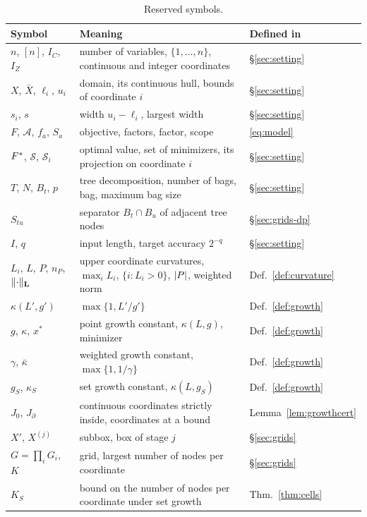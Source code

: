\begin{table}[htbp]
\centering
\small
\caption{Reserved symbols.}\label{tab:notation}
\begin{tabular}{@{}lll@{}}
\toprule
Symbol & Meaning & Defined in\\
\midrule
$n$, $[n]$, $I_C$, $I_Z$ & number of variables, $\{1,\dots,n\}$, continuous and integer coordinates & \S\ref{sec:setting}\\
$X$, $\bar X$, $\ell_i$, $u_i$ & domain, its continuous hull, bounds of coordinate $i$ & \S\ref{sec:setting}\\
$s_i$, $s$ & width $u_i-\ell_i$, largest width & \S\ref{sec:setting}\\
$F$, $\mathcal A$, $f_a$, $S_a$ & objective, factors, factor, scope & \eqref{eq:model}\\
$F^{*}$, $\mathcal S$, $\mathcal S_i$ & optimal value, set of minimizers, its projection on coordinate $i$ & \S\ref{sec:setting}\\
$T$, $N$, $B_t$, $p$ & tree decomposition, number of bags, bag, maximum bag size & \S\ref{sec:setting}\\
$S_{tu}$ & separator $B_t\cap B_u$ of adjacent tree nodes & \S\ref{sec:grids-dp}\\
$I$, $q$ & input length, target accuracy $2^{-q}$ & \S\ref{sec:setting}\\
$L_i$, $L$, $P$, $n_P$, $\lVert \cdot\rVert_{\mathbf L}$ & upper coordinate curvatures, $\max_iL_i$, $\{i:L_i>0\}$, $\lvert P\rvert$, weighted norm & Def.~\ref{def:curvature}\\
$\kappa(L',g')$ & $\max\{1,L'/g'\}$ & Def.~\ref{def:growth}\\
$g$, $\kappa$, $x^*$ & point growth constant, $\kappa(L,g)$, minimizer & Def.~\ref{def:growth}\\
$\gamma$, $\bar\kappa$ & weighted growth constant, $\max\{1,1/\gamma\}$ & Def.~\ref{def:growth}\\
$g_S$, $\kappa_S$ & set growth constant, $\kappa(L,g_S)$ & Def.~\ref{def:growth}\\
$J_0$, $J_\partial$ & continuous coordinates strictly inside, coordinates at a bound & Lemma~\ref{lem:growthcert}\\
$X'$, $X^{(j)}$ & subbox, box of stage $j$ & \S\ref{sec:grids}\\
$G=\prod_iG_i$, $K$ & grid, largest number of nodes per coordinate & \S\ref{sec:grids}\\
$K_S$ & bound on the number of nodes per coordinate under set growth & Thm.~\ref{thm:cells}\\

\end{tabular}
\end{table}
